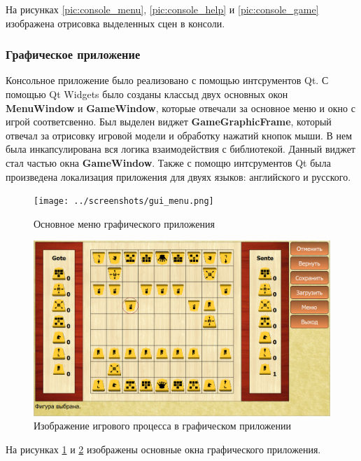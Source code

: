 На рисунках \ref{pic:console_menu}, \ref{pic:console_help} и \ref{pic:console_game} изображена отрисовка выделенных сцен в консоли. 

\subsubsection{Графическое приложение}

Консольное приложение было реализовано с помощью интсрументов Qt. С помощью Qt Widgets было созданы классыд двух основных окон \textbf{MenuWindow} и \textbf{GameWindow}, которые отвечали за основное меню и окно с игрой соответсвенно. Был выделен виджет \textbf{GameGraphicFrame}, который отвечал за отрисовку игровой модели и обработку нажатий кнопок мыши. В нем была инкапсулирована вся логика взаимодействия с библиотекой. Данный виджет стал частью окна \textbf{GameWindow}. Также с помощю интсрументов Qt была произведена локализация приложения для двуях языков: английского и русского. 

\begin{figure}[H]
	\begin{center}
		\texttt{[image: ../screenshots/gui\_menu.png]}
		\caption{Основное меню графического приложения}
		\label{pic:gui_menu}
	\end{center}
\end{figure} 

\begin{figure}[H]
	\begin{center}
		\includegraphics[scale=0.7]{../screenshots/gui_game.png}
		\caption{Изображение игрового процесса в графическом приложении}
		\label{pic:gui_game}
	\end{center}
\end{figure} 

На рисунках \ref{pic:gui_menu} и \ref{pic:gui_game} изображены основные окна графического приложения.   
   
